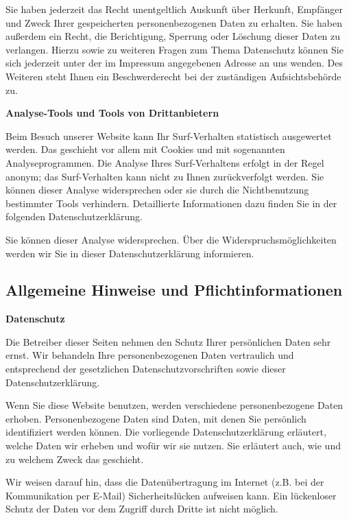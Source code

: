 \documentclass[12pt,a4paper]{scrartcl}
\begin{document}
Sie haben jederzeit das Recht unentgeltlich Auskunft über Herkunft,
Empfänger und Zweck Ihrer gespeicherten personenbezogenen Daten zu
erhalten. Sie haben außerdem ein Recht, die Berichtigung, Sperrung oder
Löschung dieser Daten zu verlangen. Hierzu sowie zu weiteren Fragen zum
Thema Datenschutz können Sie sich jederzeit unter der im Impressum
angegebenen Adresse an uns wenden. Des Weiteren steht Ihnen ein
Beschwerderecht bei der zuständigen Aufsichtsbehörde zu.

\textbf{Analyse-Tools und Tools von Drittanbietern}

Beim Besuch unserer Website kann Ihr Surf-Verhalten statistisch
ausgewertet werden. Das geschieht vor allem mit Cookies und mit
sogenannten Analyseprogrammen. Die Analyse Ihres Surf-Verhaltens erfolgt
in der Regel anonym; das Surf-Verhalten kann nicht zu Ihnen
zurückverfolgt werden. Sie können dieser Analyse widersprechen oder sie
durch die Nichtbenutzung bestimmter Tools verhindern. Detaillierte
Informationen dazu finden Sie in der folgenden Datenschutzerklärung.

Sie können dieser Analyse widersprechen. Über die
Widerspruchsmöglichkeiten werden wir Sie in dieser Datenschutzerklärung
informieren.

\hypertarget{allgemeine-hinweise-und-pflichtinformationen}{%
\subsection{Allgemeine Hinweise und
Pflichtinformationen}\label{allgemeine-hinweise-und-pflichtinformationen}}

\textbf{Datenschutz}

Die Betreiber dieser Seiten nehmen den Schutz Ihrer persönlichen Daten
sehr ernst. Wir behandeln Ihre personenbezogenen Daten vertraulich und
entsprechend der gesetzlichen Datenschutzvorschriften sowie dieser
Datenschutzerklärung.

Wenn Sie diese Website benutzen, werden verschiedene personenbezogene
Daten erhoben. Personenbezogene Daten sind Daten, mit denen Sie
persönlich identifiziert werden können. Die vorliegende
Datenschutzerklärung erläutert, welche Daten wir erheben und wofür wir
sie nutzen. Sie erläutert auch, wie und zu welchem Zweck das geschieht.

Wir weisen darauf hin, dass die Datenübertragung im Internet (z.B. bei
der Kommunikation per E-Mail) Sicherheitslücken aufweisen kann. Ein
lückenloser Schutz der Daten vor dem Zugriff durch Dritte ist nicht
möglich.
\end{document}
